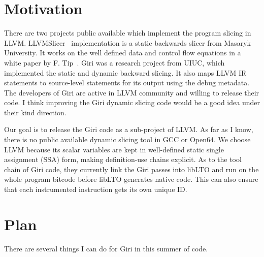 \documentclass[DIV=calc, paper=a4, fontsize=11pt, twocolumn]{scrartcl}
\begin{document}
\section*{Motivation}
There are two projects public available which implement the program slicing in LLVM.
LLVMSlicer~\cite{llvmslicer} implementation is a static backwards slicer from Masaryk University.
It works on the well defined data and control flow equations in a white paper by F. Tip~\cite{tip1995survey}.
Giri was a research project from UIUC, which implemented the static and dynamic backward slicing.
It also maps LLVM IR statements to source-level statements for its output using the debug metadata.  
The developers of Giri are active in LLVM community and willing to release their code.
I think improving the Giri dynamic slicing code would be a good idea under their kind direction.

Our goal is to release the Giri code as a sub-project of LLVM.
As far as I know, there is no public available dynamic slicing tool in GCC or Open64.
We choose LLVM because its scalar variables are kept in well-defined static single assignment (SSA) form,
making definition-use chains explicit.
As to the tool chain of Giri code,
they currently link the Giri passes into libLTO and run on the whole program bitcode before libLTO generates native code.
This can also ensure that each instrumented instruction gets its own unique ID.

\section*{Plan}
There are several things I can do for Giri in this summer of code.
\end{document}
